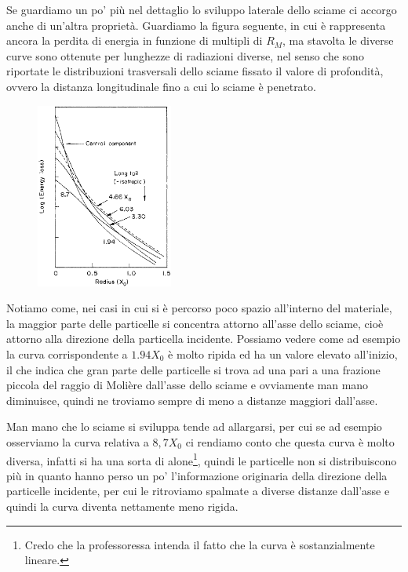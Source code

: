 Se guardiamo un po' più nel dettaglio lo sviluppo laterale dello sciame ci accorgo anche di un'altra proprietà. Guardiamo la figura seguente, in cui è rappresenta ancora la perdita di energia in funzione di multipli di $R_M$, ma stavolta le diverse curve sono ottenute per lunghezze di radiazioni diverse, nel senso che sono riportate le distribuzioni trasversali dello sciame fissato il valore di profondità, ovvero la distanza longitudinale fino a cui lo sciame è penetrato.

\begin{figure}[H]
    \centering
    \includegraphics[width=0.4\textwidth]{immagini/raggio_di_Moliere_2.png}
\end{figure}

Notiamo come, nei casi in cui si è percorso poco spazio all'interno del materiale, la maggior parte delle particelle si concentra attorno all'asse dello sciame, cioè attorno alla direzione della particella incidente. Possiamo vedere come ad esempio la curva corrispondente a $1.94X_0$ è molto ripida ed ha un valore elevato all'inizio, il che indica che gran parte delle particelle si trova ad una pari a una frazione piccola del raggio di Molière dall'asse dello sciame e ovviamente man mano diminuisce, quindi ne troviamo sempre di meno a distanze maggiori dall'asse.

Man mano che lo sciame si sviluppa tende ad allargarsi, per cui se ad esempio osserviamo la curva relativa a $8,7X_0$ ci rendiamo conto che questa curva è molto diversa, infatti si ha una sorta di alone\footnote{Credo che la professoressa intenda il fatto che la curva è sostanzialmente lineare.}, quindi le particelle non si distribuiscono più in quanto hanno perso un po' l'informazione originaria della direzione della particelle incidente, per cui le ritroviamo spalmate a diverse distanze dall'asse e quindi la curva diventa nettamente meno rigida.

